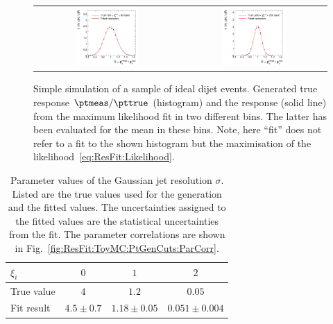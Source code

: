 \begin{figure}[ht]
\centering
\begin{tabular}{cc}
  \includegraphics[width=0.45\textwidth]{figures/resFit_ToyMC_PtGenCuts_ResolutionBin1} &
  \includegraphics[width=0.45\textwidth]{figures/resFit_ToyMC_PtGenCuts_ResolutionBin7} \\      
\end{tabular}
\caption{Simple simulation of a sample of ideal dijet events.
  Generated true response \mbox{$\ptmeas / \pttrue$} (histogram) and
  the response (solid line) from the maximum likelihood fit in two
  different \pttrue bins.
  The latter has been evaluated for the mean \pttrue in these bins.
  Note, here ``fit'' does not refer to a fit to the shown histogram but the maximisation of the likelihood~\eqref{eq:ResFit:Likelihood}.
}
\label{fig:ResFit:ToyMC:PtGenCuts:Response}
\end{figure}


\begin{table}[ht]
  \caption{Parameter values of the Gaussian jet \pt resolution
    $\sigma$.
    Listed are the true values used for the generation and
    the fitted values.
    The uncertainties assigned to the fitted values
    are the statistical uncertainties from the fit.
    The parameter correlations are shown in Fig.~\ref{fig:ResFit:ToyMC:PtGenCuts:ParCorr}.}
  \centering
  \begin{tabular}[ht]{lccc}
    \toprule
    $\xi_{i}$ & $0$ & $1$ & $2$ \\
    \midrule
    True value & $4$           & $1.2$           & $0.05$ \\
    Fit result & $4.5 \pm 0.7$ & $1.18 \pm 0.05$ & $0.051 \pm 0.004$ \\
    \bottomrule
  \end{tabular}
  \label{tab:ResFit:ToyMC:PtGenCuts:FitResult}
\end{table}


